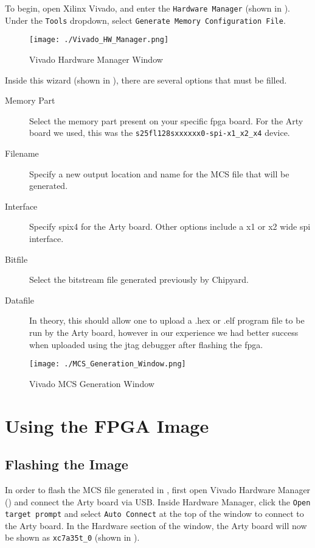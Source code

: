 To begin, open Xilinx Vivado, and enter the \texttt{Hardware Manager} (shown in ).
Under the \texttt{Tools} dropdown, select \texttt{Generate Memory Configuration File}.
\begin{figure}[h!tbp]
  \centering
  \texttt{[image: ./Vivado\_HW\_Manager.png]}
  \caption{Vivado Hardware Manager Window}
  \label{fig:Vivado_HW_Manager}
\end{figure}

Inside this wizard (shown in ), there are several options that must be filled.
\begin{description}
\item[Memory Part] Select the memory part present on your specific \Gls{fpga} board.
  For the Arty board we used, this was the \texttt{s25fl128sxxxxxx0-spi-x1\_x2\_x4} device.
\item[Filename] Specify a new output location and name for the MCS file that will be generated.
\item[Interface] Specify \Gls{spi}x4 for the Arty board. Other options include a x1 or x2 wide \Gls{spi} interface.
\item[Bitfile] Select the bitstream file generated previously by Chipyard.
\item[Datafile] In theory, this should allow one to upload a .hex or .elf program file to be run by the Arty board, however in our experience we had better success when uploaded using the \Gls{jtag} debugger after flashing the \Gls{fpga}.
\end{description}

\begin{figure}[h!tbp]
  \centering
  \texttt{[image: ./MCS\_Generation\_Window.png]}
  \caption{Vivado MCS Generation Window}
  \label{fig:Vivado_MCS_Window}
\end{figure}

\section{Using the FPGA Image}\label{sec:Using_FPGA_Image}
\subsection{Flashing the Image}\label{sec:Flash_FPGA_Image}
In order to flash the MCS file generated in , first open Vivado Hardware Manager () and connect the Arty board via USB.
Inside Hardware Manager, click the \texttt{Open target prompt} and select \texttt{Auto Connect} at the top of the window to connect to the Arty board.
In the Hardware section of the window, the Arty board will now be shown as \texttt{xc7a35t\_0} (shown in ).

